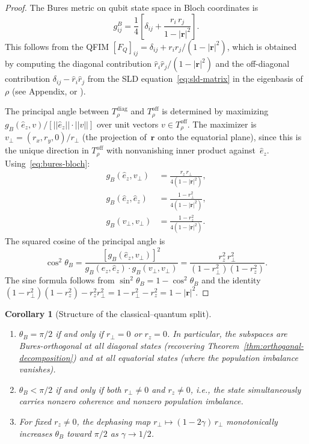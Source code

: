 \documentclass[12pt,a4paper]{article}
\newtheorem{corollary}[theorem]{Corollary}
\theoremstyle{definition}
\theoremstyle{remark}
\begin{document}
\begin{proof}
The Bures metric on qubit state space in Bloch coordinates is
\begin{equation}
\label{eq:bures-bloch}
g_{ij}^B = \frac{1}{4}\!\left[\delta_{ij} + \frac{r_i\, r_j}{1 - |\mathbf{r}|^2}\right].
\end{equation}
This follows from the QFIM $[F_Q]_{ij} = \delta_{ij} + r_i r_j/(1-|\mathbf{r}|^2)$, which is obtained by computing the diagonal contribution $\hat{r}_i \hat{r}_j/(1-|\mathbf{r}|^2)$ and the off-diagonal contribution $\delta_{ij} - \hat{r}_i \hat{r}_j$ from the SLD equation~\eqref{eq:sld-matrix} in the eigenbasis of~$\rho$ (see Appendix, or \cite{braunstein1994statistical}).

The principal angle between $T_\rho^{\mathrm{diag}}$ and $T_\rho^{\mathrm{off}}$ is determined by maximizing $g_B(\hat{e}_z, v)/[||\hat{e}_z|| \cdot ||v||]$ over unit vectors $v \in T_\rho^{\mathrm{off}}$.  The maximizer is $v_\perp = (r_x, r_y, 0)/r_\perp$ (the projection of~$\mathbf{r}$ onto the equatorial plane), since this is the unique direction in $T_\rho^{\mathrm{off}}$ with nonvanishing inner product against~$\hat{e}_z$.  Using~\eqref{eq:bures-bloch}:
\begin{align*}
g_B(\hat{e}_z, v_\perp) &= \frac{r_z\, r_\perp}{4(1 - |\mathbf{r}|^2)}, \\[3pt]
g_B(\hat{e}_z, \hat{e}_z) &= \frac{1 - r_\perp^2}{4(1 - |\mathbf{r}|^2)}, \\[3pt]
g_B(v_\perp, v_\perp) &= \frac{1 - r_z^2}{4(1 - |\mathbf{r}|^2)}.
\end{align*}
The squared cosine of the principal angle is
\[
\cos^2\theta_B = \frac{[g_B(\hat{e}_z, v_\perp)]^2}{g_B(\hat{e}_z, \hat{e}_z) \cdot g_B(v_\perp, v_\perp)} = \frac{r_z^2\, r_\perp^2}{(1 - r_\perp^2)(1 - r_z^2)}.
\]
The sine formula follows from $\sin^2\theta_B = 1 - \cos^2\theta_B$ and the identity $(1 - r_\perp^2)(1 - r_z^2) - r_z^2 r_\perp^2 = 1 - r_\perp^2 - r_z^2 = 1 - |\mathbf{r}|^2$.
\end{proof}

\begin{corollary}[Structure of the classical--quantum split]
\label{cor:angle-structure}
\quad
\begin{enumerate}
\item[\emph{(i)}] $\theta_B = \pi/2$ if and only if $r_\perp = 0$ \emph{or} $r_z = 0$.  In particular, the subspaces are Bures-orthogonal at all diagonal states (recovering Theorem~\ref{thm:orthogonal-decomposition}) and at all equatorial states (where the population imbalance vanishes).
\item[\emph{(ii)}] $\theta_B < \pi/2$ if and only if both $r_\perp \neq 0$ and $r_z \neq 0$, i.e., the state simultaneously carries nonzero coherence and nonzero population imbalance.
\item[\emph{(iii)}] For fixed $r_z \neq 0$, the dephasing map $r_\perp \mapsto (1-2\gamma)\, r_\perp$ monotonically increases $\theta_B$ toward $\pi/2$ as $\gamma \to 1/2$.
\end{enumerate}
\end{corollary}
\end{document}
